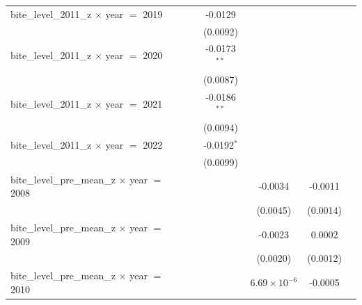 \begin{tabular}{lccccc}
   bite\_level\_2011\_z $\times$ year $=$ 2019                  &                    & -0.0129         &                       &                            &   \\   
                                                                &                    & (0.0092)        &                       &                            &   \\   
   bite\_level\_2011\_z $\times$ year $=$ 2020                  &                    & -0.0173$^{**}$  &                       &                            &   \\   
                                                                &                    & (0.0087)        &                       &                            &   \\   
   bite\_level\_2011\_z $\times$ year $=$ 2021                  &                    & -0.0186$^{**}$  &                       &                            &   \\   
                                                                &                    & (0.0094)        &                       &                            &   \\   
   bite\_level\_2011\_z $\times$ year $=$ 2022                  &                    & -0.0192$^{*}$   &                       &                            &   \\   
                                                                &                    & (0.0099)        &                       &                            &   \\   
   bite\_level\_pre\_mean\_z $\times$ year $=$ 2008             &                    &                 & -0.0034               & -0.0011                    &   \\   
                                                                &                    &                 & (0.0045)              & (0.0014)                   &   \\   
   bite\_level\_pre\_mean\_z $\times$ year $=$ 2009             &                    &                 & -0.0023               & 0.0002                     &   \\   
                                                                &                    &                 & (0.0020)              & (0.0012)                   &   \\   
   bite\_level\_pre\_mean\_z $\times$ year $=$ 2010             &                    &                 & $6.69\times 10^{-6}$  & -0.0005                    &   \\   

\end{tabular}
